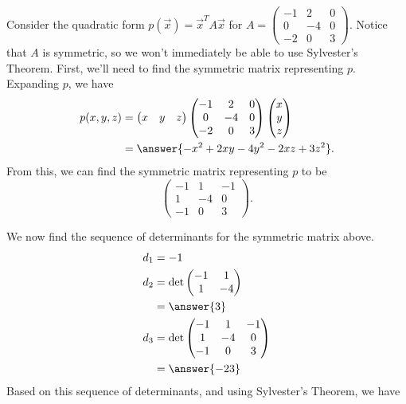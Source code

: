 \documentclass{ximera}
\begin{document}
\begin{example}
Consider the quadratic form $p(\vec{x}) = \vec{x}^T A\vec{x}$ for $A = \begin{pmatrix} -1 & 2 & 0\\ 0 & -4 & 0 \\ -2 & 0 & 3\end{pmatrix}$. Notice that $A$ is symmetric, so we won't immediately be able to use Sylvester's Theorem. First, we'll need to find the symmetric matrix representing $p$. Expanding $p$, we have
\begin{align*}
p(x,y,z) &= \begin{pmatrix} x & y & z\end{pmatrix}\begin{pmatrix} -1 & 2 & 0\\0 & -4 & 0\\-2 & 0 & 3\end{pmatrix}\begin{pmatrix} x \\ y\\ z\end{pmatrix}\\
&= \answer{-x^2 + 2xy - 4y^2 - 2xz + 3z^2}.
\end{align*}
From this, we can find the symmetric matrix representing $p$ to be
\[
\begin{pmatrix} -1 & 1 & -1\\ 1 & -4 & 0 \\ -1 & 0 & 3\end{pmatrix}.
\]

We now find the sequence of determinants for the symmetric matrix above.
\begin{align*}
d_1 &= -1\\
d_2 &= \text{det}\begin{pmatrix} -1 & 1\\1 & -4\end{pmatrix}\\
&= \answer{3}\\
d_3 &= \text{det}\begin{pmatrix} -1 & 1 & -1\\ 1 & -4 & 0 \\ -1 & 0 & 3\end{pmatrix}\\
&= \answer{-23}
\end{align*}
Based on this sequence of determinants, and using Sylvester's Theorem, we have
\begin{multipleChoice}
\end{multipleChoice}
\end{example}
\end{document}
